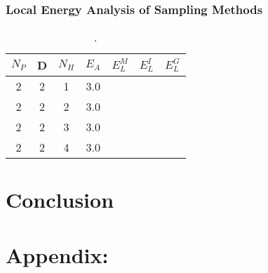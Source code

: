 \documentclass[12pt,a4paper,english]{article}
\begin{document}
\subsubsection{Local Energy Analysis of Sampling Methods}
\label{subsubsect:Results_int_Analysis}
\begin{table}[htbp!]
	\centering
	\begin{tabular}{ |c|c|c|c|c|c|c| }
		\hline \rule{0pt}{13pt}
		$N_P$ & D & $N_H$ & $E_A$ & $E_L^M$ & $E_L^I$ & $E_L^G$ \\
		\hline \rule{0pt}{13pt}%
		2 & 2 & 1 & 3.0 &  &  &  \\
		2 & 2 & 2 & 3.0 &  &  &  \\
		2 & 2 & 3 & 3.0 &  &  &  \\
		2 & 2 & 4 & 3.0 &  &  &  \\
		\hline
	\end{tabular}	
	\caption{. \label{tab:Int_energies}}
\end{table}
\section{Conclusion}
\label{sect:Conclusion}


\appendix
\section*{Appendix:}
\end{document}
